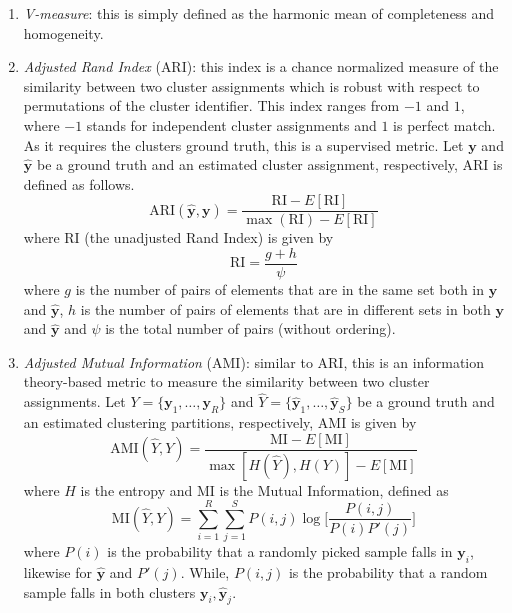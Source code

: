 \begin{enumerate}
\begin{enumerate}[label=(\roman*)]
        	\item \textit{V-measure}: this is simply defined as the harmonic mean of completeness and homogeneity.
        	
        	\item \textit{Adjusted Rand Index} (\ac{ARI}): this index is a chance normalized measure of the similarity between two cluster assignments which is robust with respect to permutations of the cluster identifier. This index ranges from $-1$ and $1$, where $-1$ stands for independent cluster assignments and $1$ is perfect match. As it requires the clusters ground truth, this is a supervised metric. Let $\bm{y}$ and $\bm{\hat y}$ be a ground truth and an estimated cluster assignment, respectively, ARI is defined as follows.
        	\begin{equation} \label{eq:metrics_ari}
        	\text{ARI} (\bm{\hat y}, \bm{y}) = \frac{\text{RI} - E[\text{RI}]}{\max(\text{RI}) - E[\text{RI}]}
        	\end{equation}
        	where $\text{RI}$ (the unadjusted Rand Index) is given by
        	$$
        	\text{RI} = \frac{g+h}{\psi}
        	$$
        	where $g$ is the number of pairs of elements that are in the same set both in $\bm{y}$ and $\bm{\hat y}$, $h$ is the number of pairs of elements that are in different sets in both $\bm{y}$ and $\bm{\hat y}$ and $\psi$ is the total number of pairs (without ordering).
        	
        	\item \textit{Adjusted Mutual Information} (\ac{AMI}): similar to ARI, this is an information theory-based metric to measure the similarity between two cluster assignments. Let $Y = \{\bm{y}_1, \dots, \bm{y}_R \}$ and $\hat Y = \{ \bm{\hat y}_1, \dots, \bm{\hat y}_S \}$ be a ground truth and an estimated clustering partitions, respectively, AMI is given by
        	\begin{equation} \label{eq:metrics_ami}
        	\text{AMI} (\hat Y, Y) = \frac{\text{MI} - E[\text{MI}]}{\max[H(\hat Y), H(Y)]- E[\text{MI}]}
        	\end{equation}
        	where $H$ is the entropy and $\text{MI}$ is the Mutual Information, defined as
        	$$
        	\text{MI}(\hat Y, Y) = \sum_{i=1}^{R} \sum_{j=1}^{S} P(i,j) \log\bigg[ \frac{P(i,j)}{P(i)P'(j)} \bigg]
        	$$
        	where $P(i)$ is the probability that a randomly picked sample falls in $\bm{y}_i$, likewise for $\bm{\hat y}$ and $P'(j)$. While, $P(i,j)$ is the probability that a random sample falls in both clusters $\bm{y}_i,\bm{\hat y}_j$.
        	
        \end{enumerate}
    
    \end{enumerate}

